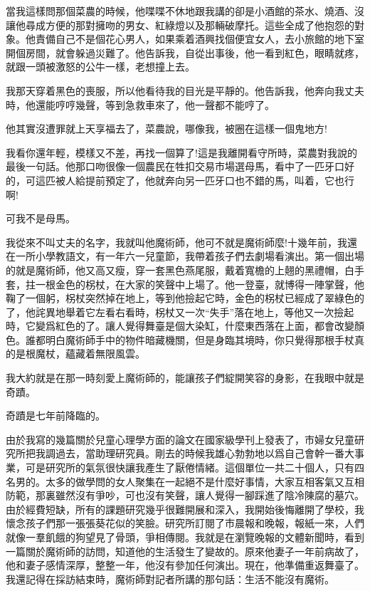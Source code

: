 \documentclass[a6paper]{article}
\begin{document}
當我這樣問那個菜農的時候，他喋喋不休地跟我講的卻是小酒館的茶水、燒酒、沒讓他尋成方便的那對擁吻的男女、紅綠燈以及那輛破摩托。這些全成了他抱怨的對象。他責備自己不是個花心男人，如果乘着酒興找個便宜女人，去小旅館的地下室開個房間，就會躲過災難了。他告訴我，自從出事後，他一看到紅色，眼睛就疼，就跟一頭被激怒的公牛一樣，老想撞上去。

我那天穿着黑色的喪服，所以他看待我的目光是平靜的。他告訴我，他奔向我丈夫時，他還能哼哼幾聲，等到急救車來了，他一聲都不能哼了。

他其實沒遭罪就上天享福去了，菜農說，哪像我，被圈在這樣一個鬼地方!

我看你還年輕，模樣又不差，再找一個算了!這是我離開看守所時，菜農對我說的最後一句話。他那口吻很像一個農民在牲扣交易市場選母馬，看中了一匹牙口好的，可這匹被人給提前預定了，他就奔向另一匹牙口也不錯的馬，叫着，它也行啊!

可我不是母馬。

我從來不叫丈夫的名字，我就叫他魔術師，他可不就是魔術師麼!十幾年前，我還在一所小學教語文，有一年六一兒童節，我帶着孩子們去劇場看演出。第一個出場的就是魔術師，他又高又瘦，穿一套黑色燕尾服，戴着寬檐的上翹的黑禮帽，白手套，拄一根金色的柺杖，在大家的笑聲中上場了。他一登臺，就博得一陣掌聲，他鞠了一個躬，柺杖突然掉在地上，等到他撿起它時，金色的柺杖已經成了翠綠色的了，他詫異地舉着它左看右看時，柺杖又一次“失手”落在地上，等他又一次撿起時，它變爲紅色的了。讓人覺得舞臺是個大染缸，什麼東西落在上面，都會改變顏色。誰都明白魔術師手中的物件暗藏機關，但是身臨其境時，你只覺得那根手杖真的是根魔杖，蘊藏着無限風雲。

我大約就是在那一時刻愛上魔術師的，能讓孩子們綻開笑容的身影，在我眼中就是奇蹟。

奇蹟是七年前降臨的。

由於我寫的幾篇關於兒童心理學方面的論文在國家級學刊上發表了，市婦女兒童研究所把我調過去，當助理研究員。剛去的時候我雄心勃勃地以爲自己會幹一番大事業，可是研究所的氣氛很快讓我產生了厭倦情緒。這個單位一共二十個人，只有四名男的。太多的做學問的女人聚集在一起絕不是什麼好事情，大家互相客氣又互相防範，那裏雖然沒有爭吵，可也沒有笑聲，讓人覺得一腳踩進了陰冷陳腐的墓穴。由於經費短缺，所有的課題研究幾乎很難開展和深入，我開始後悔離開了學校，我懷念孩子們那一張張葵花似的笑臉。研究所訂閱了市晨報和晚報，報紙一來，人們就像一羣飢餓的狗望見了骨頭，爭相傳閱。我就是在瀏覽晚報的文體新聞時，看到一篇關於魔術師的訪問，知道他的生活發生了變故的。原來他妻子一年前病故了，他和妻子感情深厚，整整一年，他沒有參加任何演出。現在，他準備重返舞臺了。我還記得在採訪結束時，魔術師對記者所講的那句話：生活不能沒有魔術。
\end{document}
